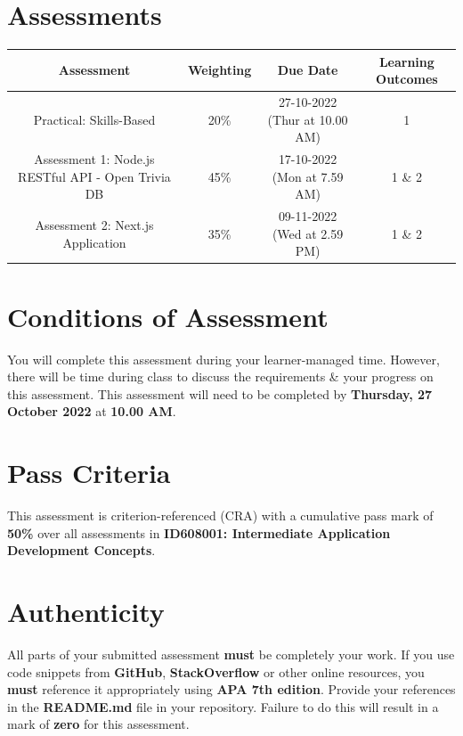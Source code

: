 \documentclass{article}
\begin{document}
\section*{Assessments}
\renewcommand{\arraystretch}{1.5}
\begin{tabular}{|c|c|c|c|}
	\hline
	\textbf{Assessment}                                       & \textbf{Weighting} & \textbf{Due Date}                    & \textbf{Learning Outcomes} \\ \hline
	\small Practical: Skills-Based                            & \small 20\%        & \small 27-10-2022 (Thur at 10.00 AM) & \small 1                   \\ \hline
	\small Assessment 1: Node.js RESTful API - Open Trivia DB & \small 45\%        & \small 17-10-2022 (Mon at 7.59 AM)   & \small 1 \& 2              \\ \hline
	\small Assessment 2: Next.js Application                  & \small 35\%        & \small 09-11-2022 (Wed at 2.59 PM)   & \small 1 \& 2              \\ \hline
\end{tabular}

\section*{Conditions of Assessment}
You will complete this assessment during your learner-managed time. However, there will be time during class to discuss the requirements \& your progress on this assessment. This assessment will need to be completed by \textbf{Thursday, 27 October 2022} at \textbf{10.00 AM}.

\section*{Pass Criteria}
This assessment is criterion-referenced (CRA) with a cumulative pass mark of \textbf{50\%} over all assessments in \textbf{ID608001: Intermediate Application Development Concepts}.

\section*{Authenticity}
All parts of your submitted assessment \textbf{must} be completely your work. If you use code snippets from \textbf{GitHub}, \textbf{StackOverflow} or other online resources, you \textbf{must} reference it appropriately using \textbf{APA 7th edition}. Provide your references in the \textbf{README.md} file in your repository. Failure to do this will result in a mark of \textbf{zero} for this assessment.
\end{document}
